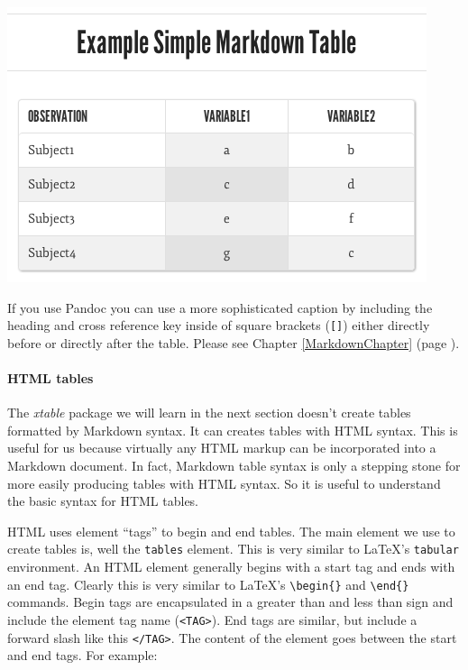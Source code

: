 \includegraphics[scale = 0.6]{Children/Chapter9/images9/MarkedCaptionTableExample.png}

\noindent If you use Pandoc you can use a more sophisticated caption by including the heading and cross reference key inside of square brackets (\verb|[]|) either directly before or directly after the table. Please see Chapter \ref{MarkdownChapter} (page \pageref{PandocDiscussion}).

\paragraph{HTML tables}

The \emph{xtable} package we will learn in the next section doesn't create tables formatted by Markdown syntax. It can creates tables with HTML syntax. This is useful for us because virtually any HTML markup can be incorporated into a Markdown document. In fact, Markdown table syntax is only a stepping stone for more easily producing tables with HTML syntax. So it is useful to understand the basic syntax for HTML tables.

HTML uses element ``tags'' to begin and end tables. The main element we use to create tables is, well the \texttt{tables} element. This is very similar to LaTeX's \texttt{tabular} environment. An HTML element generally begins with a start tag and ends with an end tag. Clearly this is very similar to LaTeX's \verb|\begin{}| and \verb|\end{}| commands. Begin tags are encapsulated in a greater than and less than sign and include the element tag name (\verb|<TAG>|). End tags are similar, but include a forward slash like this \verb|</TAG>|. The content of the element goes between the start and end tags. For example:

